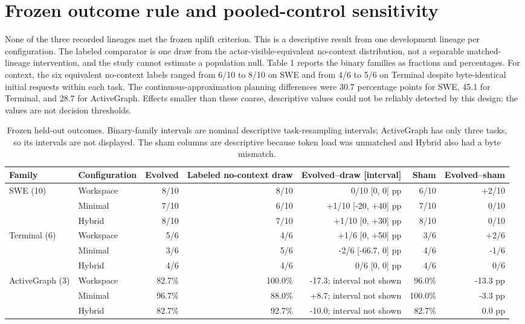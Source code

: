 \documentclass[10pt,twocolumn]{article}
\begin{document}
\section{Frozen outcome rule and pooled-control sensitivity}\label{frozen-outcome-rule-and-pooled-control-sensitivity}

None of the three recorded lineages met the frozen uplift criterion.
This is a descriptive result from one development lineage per
configuration. The labeled comparator is one draw from the
actor-visible-equivalent no-context distribution, not a separable
matched-lineage intervention, and the study cannot estimate a population
null. Table 1 reports the binary families as fractions and percentages.
For context, the six equivalent no-context labels ranged from 6/10 to
8/10 on SWE and from 4/6 to 5/6 on Terminal despite byte-identical
initial requests within each task. The continuous-approximation planning
differences were 30.7 percentage points for SWE, 45.1 for Terminal, and
28.7 for ActiveGraph. Effects smaller than these coarse, descriptive
values could not be reliably detected by this design; the values are not
decision thresholds.

\begin{table}[t]
\caption{Frozen held-out outcomes. Binary-family intervals are nominal descriptive task-resampling intervals; ActiveGraph has only three tasks, so its intervals are not displayed. The sham columns are descriptive because token load was unmatched and Hybrid also had a byte mismatch.}
\label{tab:outcomes}
\centering\tiny
\setlength{\tabcolsep}{3pt}
\begin{tabular}{@{}llrrrrr@{}}
\toprule
\textbf{Family} & \textbf{Configuration} & \textbf{Evolved} & \textbf{Labeled no-context draw} & \textbf{Evolved--draw [interval]} & \textbf{Sham} & \textbf{Evolved--sham}\\
\midrule
SWE (10) & Workspace & 8/10 & 8/10 & 0/10 [0, 0] pp & 6/10 & +2/10\\
 & Minimal & 7/10 & 6/10 & +1/10 [-20, +40] pp & 7/10 & 0/10\\
 & Hybrid & 8/10 & 7/10 & +1/10 [0, +30] pp & 8/10 & 0/10\\
Terminal (6) & Workspace & 5/6 & 4/6 & +1/6 [0, +50] pp & 3/6 & +2/6\\
 & Minimal & 3/6 & 5/6 & -2/6 [-66.7, 0] pp & 4/6 & -1/6\\
 & Hybrid & 4/6 & 4/6 & 0/6 [0, 0] pp & 4/6 & 0/6\\
ActiveGraph (3) & Workspace & 82.7\% & 100.0\% & -17.3; interval not shown & 96.0\% & -13.3 pp\\
 & Minimal & 96.7\% & 88.0\% & +8.7; interval not shown & 100.0\% & -3.3 pp\\
 & Hybrid & 82.7\% & 92.7\% & -10.0; interval not shown & 82.7\% & 0.0 pp\\
\bottomrule
\end{tabular}
\end{table}
\end{document}

